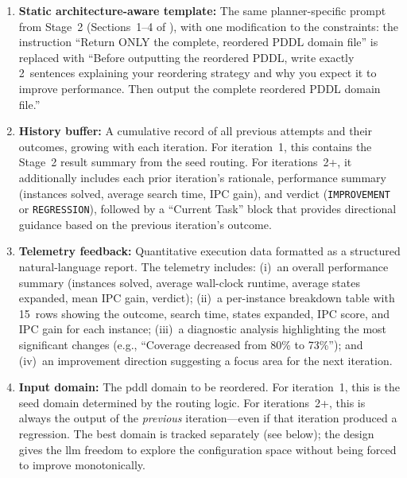 \begin{enumerate}
  \item \textbf{Static architecture-aware template:}
        The same planner-specific prompt from Stage~2 (Sections~1--4 of ), with one modification to the constraints: the instruction ``Return ONLY the complete, reordered PDDL domain file'' is replaced with ``Before outputting the reordered PDDL, write exactly 2~sentences explaining your reordering strategy and why you expect it to improve performance.
        Then output the complete reordered PDDL domain file.''

  \item \textbf{History buffer:}
        A cumulative record of all previous attempts and their outcomes, growing with each iteration.
        For iteration~1, this contains the Stage~2 result summary from the seed routing.
        For iterations~2+, it additionally includes each prior iteration's rationale, performance summary (instances solved, average search time, IPC gain), and verdict (\texttt{IMPROVEMENT} or \texttt{REGRESSION}), followed by a ``Current Task'' block that provides directional guidance based on the previous iteration's outcome.

  \item \textbf{Telemetry feedback:}
        Quantitative execution data formatted as a structured natural-language report.
        The telemetry includes: (i)~an overall performance summary (instances solved, average wall-clock runtime, average states expanded, mean IPC gain, verdict); (ii)~a per-instance breakdown table with 15~rows showing the outcome, search time, states expanded, IPC score, and IPC gain for each instance; (iii)~a diagnostic analysis highlighting the most significant changes (e.g., ``Coverage decreased from 80\% to 73\%''); and (iv)~an improvement direction suggesting a focus area for the next iteration.

  \item \textbf{Input domain:}
        The \gls{pddl} domain to be reordered.
        For iteration~1, this is the seed domain determined by the routing logic.
        For iterations~2+, this is always the output of the \emph{previous} iteration---even if that iteration produced a regression.
        The best domain is tracked separately (see below); the design gives the \gls{llm} freedom to explore the configuration space without being forced to improve monotonically.
\end{enumerate}

